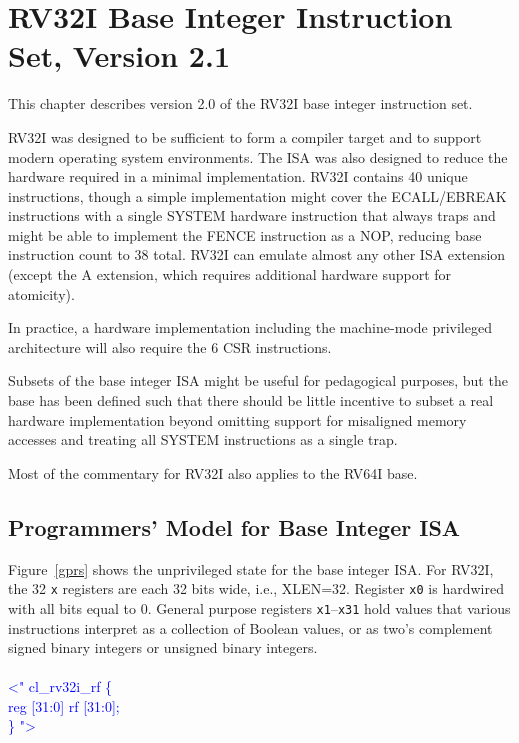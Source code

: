 \chapter{RV32I Base Integer Instruction Set, Version 2.1}
\label{rv32}

This chapter describes version 2.0 of the RV32I base integer
instruction set.

\begin{commentary}
RV32I was designed to be sufficient to form a compiler target and to
support modern operating system environments.  The ISA was also
designed to reduce the hardware required in a minimal implementation.
RV32I contains 40 unique instructions, though a simple implementation
might cover the ECALL/EBREAK instructions with a single SYSTEM
hardware instruction that always traps and might be able to implement
the FENCE instruction as a NOP, reducing base instruction count to 38
total.  RV32I can emulate almost any other ISA extension (except the A
extension, which requires additional hardware support for atomicity).

In practice, a hardware implementation including the machine-mode
privileged architecture will also require the 6 CSR instructions.

Subsets of the base integer ISA might be useful for pedagogical
purposes, but the base has been defined such that there should be
little incentive to subset a real hardware implementation beyond
omitting support for misaligned memory accesses and treating all
SYSTEM instructions as a single trap.
\end{commentary}

\begin{commentary}
Most of the commentary for RV32I also applies to the RV64I base.
\end{commentary}

\section{Programmers' Model for Base Integer ISA}

\setlength\parindent{24pt}

Figure~\ref{gprs} shows the unprivileged state for the base integer
ISA.  For RV32I, the 32 {\tt x} registers are each 32 bits wide, i.e.,
XLEN=32.  Register {\tt x0} is hardwired with all bits equal to 0.
General purpose registers {\tt x1}--{\tt x31} hold values that various
instructions interpret as a collection of Boolean values, or as two's
complement signed binary integers or unsigned binary integers.\\
\\
\textcolor{blue}{
\noindent \textless" cl\_rv32i\_rf \{\\%
\indent reg [31:0] rf [31:0]; \\%
\} "\textgreater\\%
}


